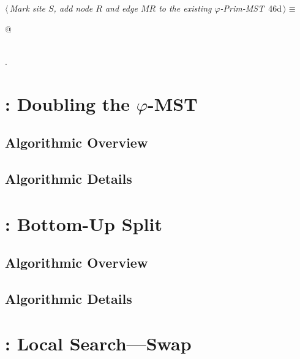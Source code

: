 \documentclass[11.5pt]{report}
\begin{document}
\vspace{-0.8cm}\newchunk
\begin{flushleft} \small
\begin{minipage}{\linewidth}\label{scrap70}\raggedright\small
{} $\langle\,${\itshape Mark site $S$, add node $R$ and edge $MR$ to the existing $\varphi$-Prim-MST}\nobreak\ {\footnotesize {46d}}$\,\rangle\equiv$
\vspace{-1ex}
\begin{list}{}{} \item
\mbox{}\verb@   @\\
\mbox{}\verb@pass@\\
\mbox{}\verb@@{\NWsep}
\end{list}
\vspace{-1.5ex}
\footnotesize
\begin{list}{}{\setlength{\itemsep}{-\parsep}\setlength{\itemindent}{-\leftmargin}}
\item {\NWtxtMacroNoRef}.

\item{}
\end{list}
\end{minipage}\vspace{4ex}
\end{flushleft}
\section{: Doubling the $\varphi$-MST}  

\subsection{Algorithmic Overview}
\subsection{Algorithmic Details}
\section{: Bottom-Up Split}  

\subsection{Algorithmic Overview}
\subsection{Algorithmic Details}\section{: Local Search---Swap}  
\end{document}
